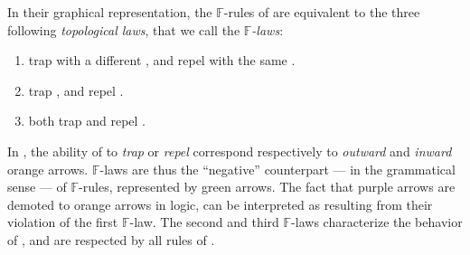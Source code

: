 \begin{description}
  In their graphical representation, the  $\mathbb{F}$-rules of
   are equivalent to the three following \emph{topological laws},
  that we call the \emph{$\mathbb{F}$-laws}:
  \begin{fact}
    \sbr
    \begin{enumerate}
      \item {}  trap  with a different
      , and repel  with the same .
      \item {}  trap  , and repel
       .
      \item {}  both trap and repel  .
    \end{enumerate}
  \end{fact}
  In , the ability of  to \emph{trap} or
  \emph{repel}  correspond respectively to \emph{outward} and
  \emph{inward} orange arrows. $\mathbb{F}$-laws are thus the ``negative''
  counterpart --- in the grammatical sense --- of $\mathbb{F}$-rules,
  represented by green arrows. The fact that purple arrows are demoted to orange
  arrows in  logic, can be interpreted as resulting from
  their violation of the first $\mathbb{F}$-law. The second and third
  $\mathbb{F}$-laws characterize the behavior of  , and are
  respected by all rules of .
  

\end{description}

